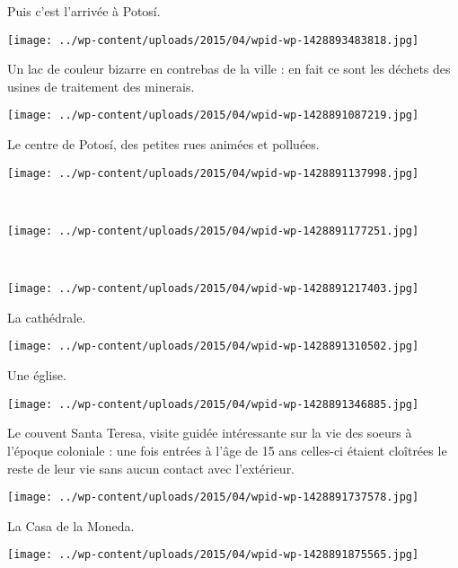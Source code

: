  Puis c'est l'arrivée à Potosí.
\begin{center} \texttt{[image: ../wp-content/uploads/2015/04/wpid-wp-1428893483818.jpg]} \end{center}
\vspace{-\topsep}

\pagebreak
 Un lac de couleur bizarre en contrebas de la ville : en fait ce sont les déchets des usines de traitement des minerais.
\begin{center} \texttt{[image: ../wp-content/uploads/2015/04/wpid-wp-1428891087219.jpg]} \end{center}

 Le centre de Potosí, des petites rues animées et polluées. 
\begin{center} \texttt{[image: ../wp-content/uploads/2015/04/wpid-wp-1428891137998.jpg]} \end{center}
\vspace{-\topsep}

\pagebreak
~\\
\begin{center} \texttt{[image: ../wp-content/uploads/2015/04/wpid-wp-1428891177251.jpg]} \end{center}
~
\begin{center} \texttt{[image: ../wp-content/uploads/2015/04/wpid-wp-1428891217403.jpg]} \end{center}
\vspace{-\topsep}

\pagebreak
  La cathédrale.
\begin{center} \texttt{[image: ../wp-content/uploads/2015/04/wpid-wp-1428891310502.jpg]} \end{center}

  Une église.
\begin{center} \texttt{[image: ../wp-content/uploads/2015/04/wpid-wp-1428891346885.jpg]} \end{center}

 Le couvent Santa Teresa, visite guidée intéressante sur la vie des soeurs à l'époque coloniale : une fois entrées à l'âge de 15 ans celles-ci étaient cloîtrées le reste de leur vie sans aucun contact avec l'extérieur. 
\begin{center} \texttt{[image: ../wp-content/uploads/2015/04/wpid-wp-1428891737578.jpg]} \end{center}

 La Casa de la Moneda.
\begin{center} \texttt{[image: ../wp-content/uploads/2015/04/wpid-wp-1428891875565.jpg]} \end{center}

